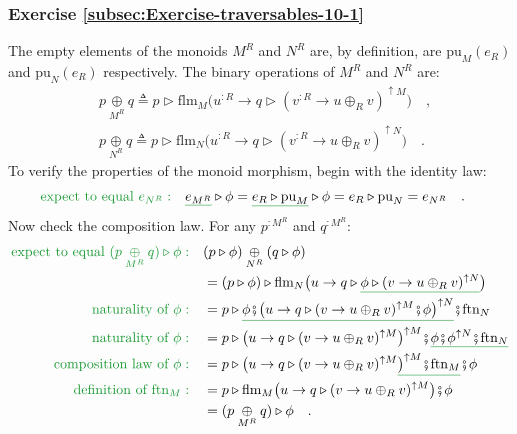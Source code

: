 \subsubsection*{Exercise \ref{subsec:Exercise-traversables-10-1}}

The empty elements of the monoids $M^{R}$ and $N^{R}$ are, by definition,
are $\text{pu}_{M}(e_{R})$ and $\text{pu}_{N}(e_{R})$ respectively.
The binary operations of $M^{R}$ and $N^{R}$ are:
\begin{align*}
 & p\underset{M^{R}}{\oplus}q\triangleq p\triangleright\text{flm}_{M}\big(u^{:R}\rightarrow q\triangleright(v^{:R}\rightarrow u\oplus_{R}v)^{\uparrow M}\big)\quad,\\
 & p\underset{N^{R}}{\oplus}q\triangleq p\triangleright\text{flm}_{N}\big(u^{:R}\rightarrow q\triangleright(v^{:R}\rightarrow u\oplus_{R}v)^{\uparrow N}\big)\quad.
\end{align*}
To verify the properties of the monoid morphism, begin with the identity
law:
\begin{align*}
{\color{greenunder}\text{expect to equal }e_{N^{R}}:}\quad & \gunderline{e_{M^{R}}}\triangleright\phi=\gunderline{e_{R}\triangleright\text{pu}_{M}}\triangleright\phi=e_{R}\triangleright\text{pu}_{N}=e_{N^{R}}\quad.
\end{align*}
Now check the composition law. For any $p^{:M^{R}}$ and $q^{:M^{R}}$:
\begin{align*}
{\color{greenunder}\text{expect to equal }(p\underset{M^{R}}{\oplus}q)\triangleright\phi:}\quad & (p\triangleright\phi)\underset{N^{R}}{\oplus}(q\triangleright\phi)\\
 & =(p\triangleright\phi)\triangleright\text{flm}_{N}\big(u\rightarrow q\triangleright\gunderline{\phi\triangleright(v\rightarrow u\oplus_{R}v)^{\uparrow N}}\big)\\
{\color{greenunder}\text{naturality of }\phi:}\quad & =p\triangleright\gunderline{\phi\bef\big(u\rightarrow q\triangleright(v\rightarrow u\oplus_{R}v)^{\uparrow M}\bef\phi\big)^{\uparrow N}}\bef\text{ftn}_{N}\\
{\color{greenunder}\text{naturality of }\phi:}\quad & =p\triangleright\big(u\rightarrow q\triangleright(v\rightarrow u\oplus_{R}v)^{\uparrow M}\big)^{\uparrow M}\bef\gunderline{\phi\bef\phi^{\uparrow N}\bef\text{ftn}_{N}}\\
{\color{greenunder}\text{composition law of }\phi:}\quad & =p\triangleright\big(u\rightarrow q\triangleright(v\rightarrow u\oplus_{R}v)^{\uparrow M}\gunderline{\big)^{\uparrow M}\bef\text{ftn}_{M}}\bef\phi\\
{\color{greenunder}\text{definition of }\text{ftn}_{M}:}\quad & =p\triangleright\text{flm}_{M}\big(u\rightarrow q\triangleright(v\rightarrow u\oplus_{R}v)^{\uparrow M}\big)\bef\phi\\
 & =(p\underset{M^{R}}{\oplus}q)\triangleright\phi\quad.
\end{align*}


